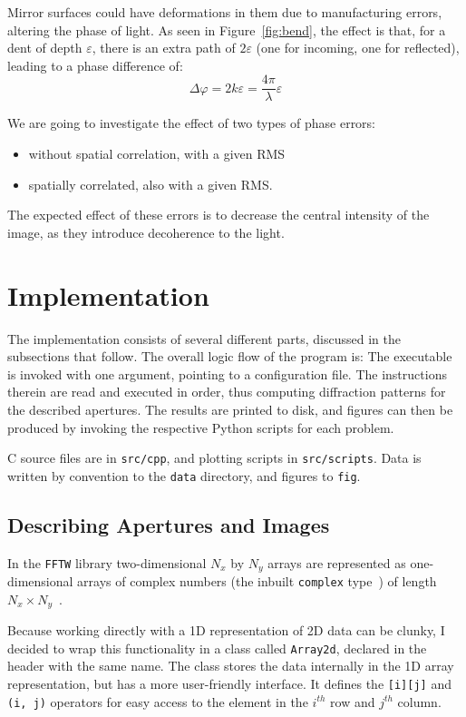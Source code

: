 \documentclass[11pt]{article}
\newcommand{\eps}{\varepsilon}
\newcommand{\ph}{\varphi}
\newcommand{\CC}{{C\nolinebreak[4]\hspace{-.05em}\raisebox{.3ex}{\scriptsize\bf ++}}}
\begin{document}
Mirror surfaces could have deformations in them due to manufacturing errors, altering the phase of light. As seen in Figure~\ref{fig:bend}, the effect is that, for a dent of depth $\eps$, there is an extra path of $2\eps$ (one for incoming, one for reflected), leading to a phase difference of:
\begin{equation}
    \Delta\ph = 2k\eps = \frac{4\pi}{\lambda}\eps
\end{equation}

We are going to investigate the effect of two types of phase errors:
\begin{itemize}
    \item without spatial correlation, with a given RMS
    \item spatially correlated, also with a given RMS.
\end{itemize}

The expected effect of these errors is to decrease the central intensity of the image, as they introduce decoherence to the light.

\section{Implementation}\label{sec:impl}
The implementation consists of several different parts, discussed in the subsections that follow. The overall logic flow of the program is:
The executable is invoked with one argument, pointing to a configuration file. The instructions therein are read and executed in order, thus computing diffraction patterns for the described apertures. The results are printed to disk, and figures can then be produced by invoking the respective Python scripts for each problem.

\CC{} source files are in \texttt{src/cpp}, and plotting scripts in \texttt{src/scripts}. Data is written by convention to the \texttt{data} directory, and figures to \texttt{fig}.

\subsection{Describing Apertures and Images}
In the \texttt{FFTW} library two-dimensional $N_x$ by $N_y$ arrays are represented as one-dimensional arrays of complex numbers (the inbuilt \texttt{complex} type~\cite{cppcomplex}) of length $N_x \times N_y$~\cite[Section 3.2]{fftw}.

Because working directly with a 1D representation of 2D data can be clunky, I decided to wrap this functionality in a class called \texttt{Array2d}, declared in the header with the same name. The class stores the data internally in the 1D array representation, but has a more user-friendly interface. It defines the \texttt{[i][j]} and \texttt{(i, j)} operators for easy access to the element in the $i^{th}$ row and $j^{th}$ column.
\end{document}
